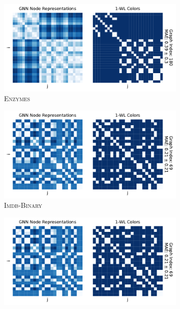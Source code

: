\begin{figure}
	\centering
	\begin{subfigure}[b]{0.49\textwidth}
		\centering
		\includegraphics[width=\textwidth]{Figures/heatmaps_ENZYMES_single.pdf}
		\vspace*{-5ex} 
        \caption{\textsc{Enzymes}}
	\end{subfigure}
	\hfill
	\begin{subfigure}[b]{0.49\textwidth}
		\centering
		\includegraphics[width=\textwidth]{Figures/heatmaps_IMDB-BINARY_single.pdf}
		\vspace*{-5ex} 
        \caption{\textsc{Imdb-Binary}}
	\end{subfigure}
	\par\bigskip
	\begin{subfigure}[b]{0.49\textwidth}
		\centering
		\includegraphics[width=\textwidth]{Figures/heatmaps_IMDB-BINARY_single.pdf}

\end{subfigure}
\end{figure}
